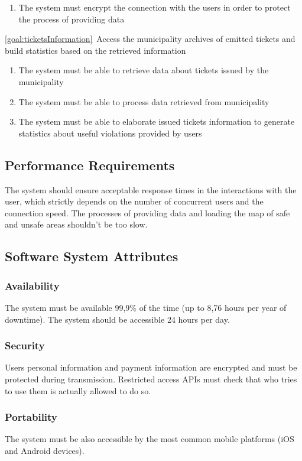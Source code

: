 \begin{description}
\begin{enumerate}[resume*]
   				\item The system must encrypt the connection with the users in order to protect the process of providing data
  			\end{enumerate}
  		\item \ref{goal:ticketsInformation}\ Access the municipality archives of emitted tickets and build statistics based on the retrieved information
  			\begin{enumerate}[resume*] 
  				\item The system must be able to retrieve data about tickets issued by the municipality 
   				\item The system must be able to process data retrieved from municipality
   				\item The system must be able to elaborate issued tickets information to generate statistics about useful violations provided by users
   			\end{enumerate}
   	\end{description}
  	
\subsection{Performance Requirements}
The system should ensure acceptable response times in the interactions with the user, which strictly depends on the number of concurrent users and the connection speed.
\newline
The processes of providing data and loading the map of safe and unsafe areas shouldn't be too slow.
\subsection{Software System Attributes}
	\subsubsection{Availability}
	The system must be available 99,9\% of the time (up to 8,76 hours per year of downtime). The system should be accessible 24 hours per day.
	\subsubsection{Security}
	Users personal information and payment information are encrypted and must be protected during transmission.
	Restricted access APIs must check that who tries to use them is actually allowed to do so.
	\subsubsection{Portability}
	The system must be also accessible by the most common mobile platforms (iOS and Android devices).

